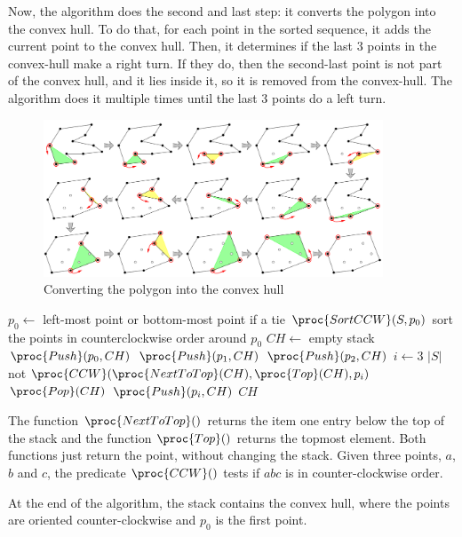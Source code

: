 \documentclass{article}
\begin{document}
Now, the algorithm does the second and last step: it converts the polygon into the convex hull. To do that, for each point in the sorted sequence, it adds the current point to the convex hull. Then, it determines if the last 3 points in the convex-hull make a right turn. If they do, then the second-last point is not part of the convex hull, and it lies inside it, so it is removed from the convex-hull. The algorithm does it multiple times until the last 3 points do a left turn.

\begin{figure}[h]
\centering
\includegraphics[width=0.9\textwidth]{graham/graham_visual.png}
\caption{\label{fig:graham_visual}Converting the polygon into the convex hull \cite{jeffe}}
\end{figure}

\begin{codebox}
\li $p_0 \gets $ left-most point or bottom-most point if a tie
\li $\proc{SortCCW}(S, p_0)$ \Comment sort the points in counterclockwise order around $p_0$
\li $CH \gets $ empty stack
\li $\proc{Push}(p_0, CH)$
\li $\proc{Push}(p_1, CH)$
\li $\proc{Push}(p_2, CH)$
\li \For $i \gets 3$ \To $|S|$
    \Do
\li     \While not$ \proc{CCW}(\proc{NextToTop}(CH), \proc{Top}(CH), p_i)$
\li     \Do
            $\proc{Pop}(CH)$
        \End
\li     $\proc{Push}(p_i, CH)$
    \End
\li \Return $CH$

\end{codebox}

The function $\proc{NextToTop}()$ returns the item one entry below the top of the stack and the function $\proc{Top}()$ returns the topmost element. Both functions just return the point, without changing the stack. Given three points, $a$, $b$ and $c$, the predicate $\proc{CCW}()$ tests if $abc$ is in counter-clockwise order.

At the end of the algorithm, the stack contains the convex hull, where the points are oriented counter-clockwise and $p_0$ is the first point.
\end{document}
